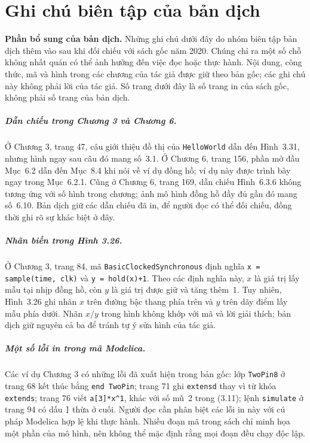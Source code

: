 \chapter*{Ghi chú biên tập của bản dịch}

\textbf{Phần bổ sung của bản dịch.} Những ghi chú dưới đây do nhóm biên tập bản dịch thêm vào sau khi đối chiếu với sách gốc năm 2020. Chúng chỉ ra một số chỗ không nhất quán có thể ảnh hưởng đến việc đọc hoặc thực hành. Nội dung, công thức, mã và hình trong các chương của tác giả được giữ theo bản gốc; các ghi chú này không phải lời của tác giả. Số trang dưới đây là số trang in của sách gốc, không phải số trang của bản dịch.

\paragraph{Dẫn chiếu trong Chương 3 và Chương 6.}
Ở Chương 3, trang 47, câu giới thiệu đồ thị của \texttt{HelloWorld} dẫn đến Hình~3.31, nhưng hình ngay sau câu đó mang số~3.1. Ở Chương 6, trang 156, phần mở đầu Mục~6.2 dẫn đến Mục~8.4 khi nói về ví dụ đồng hồ; ví dụ này được trình bày ngay trong Mục~6.2.1. Cũng ở Chương 6, trang 169, dẫn chiếu Hình~6.3.6 không tương ứng với số hình trong chương; ảnh mô hình đồng hồ đầy đủ gần đó mang số~6.10. Bản dịch giữ các dẫn chiếu đã in, để người đọc có thể đối chiếu, đồng thời ghi rõ sự khác biệt ở đây.

\paragraph{Nhãn biến trong Hình 3.26.}
Ở Chương 3, trang 84, mã \texttt{BasicClockedSynchronous} định nghĩa \texttt{x = sample(time, clk)} và \texttt{y = hold(x)+1}. Theo các định nghĩa này, \(x\) là giá trị lấy mẫu tại nhịp đồng hồ, còn \(y\) là giá trị được giữ và tăng thêm~1. Tuy nhiên, Hình~3.26 ghi nhãn \(x\) trên đường bậc thang phía trên và \(y\) trên dãy điểm lấy mẫu phía dưới. Nhãn \(x/y\) trong hình không khớp với mã và lời giải thích; bản dịch giữ nguyên cả ba để tránh tự ý sửa hình của tác giả.

\paragraph{Một số lỗi in trong mã Modelica.}
Các ví dụ Chương 3 có những lỗi đã xuất hiện trong bản gốc: lớp \texttt{TwoPin8} ở trang 68 kết thúc bằng \texttt{end TwoPin}; trang 71 ghi \texttt{extensd} thay vì từ khóa \texttt{extends}; trang 76 viết \texttt{a[3]*x\^{}1}, khác với số mũ~2 trong (3.11); lệnh \texttt{simulate} ở trang 94 có dấu \texttt{]} thừa ở cuối. Người đọc cần phân biệt các lỗi in này với cú pháp Modelica hợp lệ khi thực hành. Nhiều đoạn mã trong sách chỉ minh họa một phần của mô hình, nên không thể mặc định rằng mọi đoạn đều chạy độc lập.

